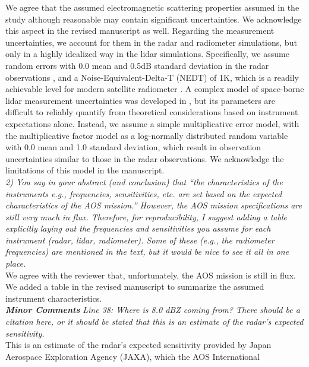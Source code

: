 \documentclass[12pt]{article}
\begin{document}
We agree that the assumed electromagnetic scattering properties assumed in the study although
reasonable may contain significant uncertainties.  We acknowledge this aspect in the revised manuscript 
as well. Regarding the measurement uncertainties, we account for them in the radar and radiometer simulations,
but only in a highly idealized way in the lidar simulations.  Specifically, we assume random errors with 0.0 mean
and 0.5dB standard deviation in the radar observations \cite{takahashi2008}, and a Noise-Equivalent-Delta-T (NEDT)
of 1K, which is a readily achievable level for modern satellite radiometer \cite{draper2015}. A complex 
model of space-borne lidar measurement uncertainties was developed in \cite{liu2006}, but its parameters are
difficult to reliably quantify from theoretical considerations based on instrument expectations alone. Instead, we
assume a simple multiplicative error model, with the multiplicative factor model as a log-normally distributed random
variable with 0.0 mean and 1.0 standard deviation, which result in observation uncertainties similar to those in
the radar observations. We acknowledge the limitations of this model in the manuscript.\\
\newline
\textit{2) You say in your abstract (and conclusion) that “the characteristics of 
the instruments e.g.,  frequencies, sensitivities, etc. are set based on the 
expected characteristics of the AOS mission.” However, the AOS mission 
specifications are still very much in flux. Therefore, for reproducibility, 
I suggest adding a table explicitly laying out the frequencies and 
sensitivities you assume for each instrument (radar, lidar, radiometer). 
Some of these (e.g., the radiometer frequencies) are mentioned in the text, 
but it would be nice to see it all in one place.}\\
\newline
We agree with the reviewer that, unfortunately, the AOS mission is still in flux. We added a table in the revised
manuscript to summarize the assumed instrument characteristics.\\
\newline
\textit{\textbf{Minor Comments}
Line 38: Where is 8.0 dBZ coming from? There should be a citation here, or it should be stated that this is 
an estimate of the radar’s expected sensitivity.}\\
\newline
This is an estimate of the radar’s expected sensitivity provided by Japan Aerospace Exploration Agency (JAXA), which the AOS International
\end{document}
